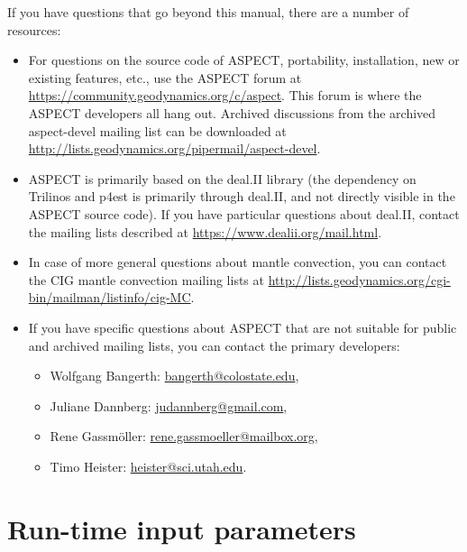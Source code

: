 \documentclass{article}
\newcommand{\aspect}{\textsc{ASPECT}}
\begin{document}
If you have questions that go beyond this manual, there are a number of
resources:
\begin{itemize}
\item For questions on the source code of \aspect{}, portability, installation, new or existing features,
  etc., use the \aspect{} forum at
  \url{https://community.geodynamics.org/c/aspect}. This
  forum is where the \aspect{} developers all hang out. Archived
  discussions from the archived aspect-devel mailing list can
  be downloaded at \url{http://lists.geodynamics.org/pipermail/aspect-devel}.

\item \aspect{} is primarily based on the deal.II library (the dependency
  on Trilinos and p4est is primarily through deal.II, and not directly
  visible in the \aspect{} source code). If you have particular questions
  about deal.II, contact
  the mailing lists described at \url{https://www.dealii.org/mail.html}.

\item In case of more general questions about mantle convection, you can
  contact the CIG mantle
  convection mailing lists at 
  \url{http://lists.geodynamics.org/cgi-bin/mailman/listinfo/cig-MC}.

\item If you have specific questions about \aspect{} that are not suitable
  for public and archived mailing lists, you can contact the
  primary developers:
  \begin{itemize}
  \item Wolfgang
    Bangerth: \url{bangerth@colostate.edu},
  \item Juliane
    Dannberg: \url{judannberg@gmail.com},
  \item Rene
    Gassm{\"o}ller: \url{rene.gassmoeller@mailbox.org},
  \item Timo
    Heister: \url{heister@sci.utah.edu}.
  \end{itemize}
\end{itemize}


\appendix

\section{Run-time input parameters}
\label{sec:parameters}




\pagebreak
\end{document}
